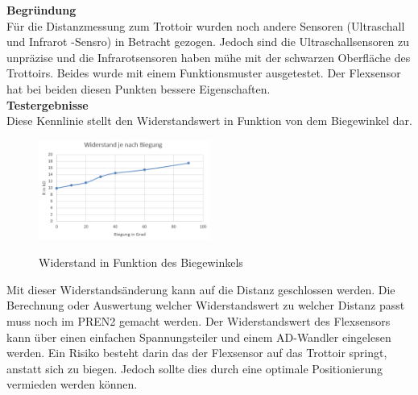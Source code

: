 %
\textbf{Begründung}\\[0.2cm]
Für die Distanzmessung zum Trottoir wurden noch andere Sensoren (Ultraschall und Infrarot -Sensro) in Betracht gezogen. Jedoch sind die Ultraschallsensoren zu unpräzise und die Infrarotsensoren haben mühe mit der schwarzen Oberfläche des Trottoirs. Beides wurde mit einem Funktionsmuster ausgetestet. Der Flexsensor hat bei beiden diesen Punkten bessere Eigenschaften.\\[0.2cm]
\textbf{Testergebnisse}\\[0.2cm]
Diese Kennlinie stellt den Widerstandswert in Funktion von dem Biegewinkel dar.
\begin{figure}[H]
	\centering
	\includegraphics[width=0.5\textwidth]{03_Loesungskonzept/pictures/Flex_Biegungskennline.png}
	\label{fig:Flex_R_Kennlinie}
	\caption{Widerstand in Funktion des Biegewinkels}
\end{figure}\flushleft
%
Mit dieser Widerstandsänderung kann auf die Distanz geschlossen werden. Die Berechnung oder Auswertung welcher Widerstandswert zu welcher Distanz passt muss noch im PREN2 gemacht werden. Der Widerstandswert des Flexsensors kann über einen einfachen Spannungsteiler und einem AD-Wandler eingelesen werden.
Ein Risiko besteht darin das der Flexsensor auf das Trottoir springt, anstatt sich zu biegen. Jedoch sollte dies durch eine optimale Positionierung vermieden werden können.\\[0.2cm]